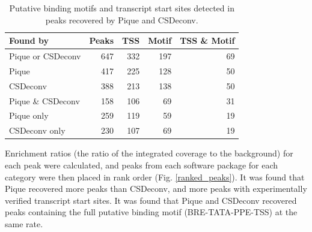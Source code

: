 \documentclass{bioinfo}
\begin{document}
\begin{table}
  \begin{center}
    \begin{tabular}{l r r r r}
      Found by & Peaks & TSS & Motif & TSS \& Motif \\
      \hline
      Pique or CSDeconv & 647 & 332 & 197 & 69 \\
      Pique             & 417 & 225 & 128 & 50 \\
      CSDeconv          & 388 & 213 & 138 & 50 \\
      Pique \& CSDeconv & 158 & 106 & 69  & 31 \\
      Pique only        & 259 & 119 & 59  & 19 \\
      CSDeconv only     & 230 & 107 & 69  & 19 \\
    \end{tabular}
  \end{center}
  \caption{Putative binding motifs and transcript start sites detected 
    in peaks recovered by Pique and CSDeconv.}\label{table1}
\end{table}

Enrichment ratios (the ratio of the integrated coverage to the
background) for each peak were calculated, and peaks from each
software package for each category were then placed in rank order
(Fig. \ref{ranked_peaks}). It was found that Pique recovered more
peaks than CSDeconv, and more peaks with experimentally verified
transcript start sites. It was found that Pique and CSDeconv recovered
peaks containing the full putative binding motif (BRE-TATA-PPE-TSS) at
the same rate.
\end{document}
